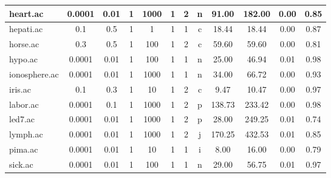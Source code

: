 \begin{table}[htbp]
{\begin{tabular}{|l|c|c|c|c|c|c|c||c|c|c|c|}
		\hline
		heart.ac       & 0.0001   & 0.01        & 1              & 1000                & 1             & 2      & n             & 91.00          & 182.00         & 0.00           & 0.85           \\
		\hline
		hepati.ac      & 0.1      & 0.5         & 1              & 1                   & 1             & 1      & c             & 18.44          & 18.44          & 0.00           & 0.87           \\
		\hline
		horse.ac       & 0.3      & 0.5         & 1              & 100                 & 1             & 2      & c             & 59.60          & 59.60          & 0.00           & 0.81           \\
		\hline
		hypo.ac        & 0.0001   & 0.01        & 1              & 100                 & 1             & 1      & n             & 25.00          & 46.94          & 0.01           & 0.98           \\
		\hline
		ionosphere.ac  & 0.0001   & 0.01        & 1              & 1000                & 1             & 1      & n             & 34.00          & 66.72          & 0.00           & 0.93           \\
		\hline
		iris.ac        & 0.1      & 0.3         & 1              & 10                  & 1             & 2      & c             & 9.47           & 10.47          & 0.00           & 0.97           \\
		\hline
		labor.ac       & 0.0001   & 0.1         & 1              & 1000                & 1             & 2      & p             & 138.73         & 233.42         & 0.00           & 0.98           \\
		\hline
		led7.ac        & 0.0001   & 0.01        & 1              & 1000                & 1             & 2      & p             & 28.00          & 249.25         & 0.01           & 0.74           \\
		\hline
		lymph.ac       & 0.0001   & 0.01        & 1              & 1000                & 1             & 2      & j             & 170.25         & 432.53         & 0.01           & 0.85           \\
		\hline
		pima.ac        & 0.0001   & 0.01        & 1              & 10                  & 1             & 1      & i             & 8.00           & 16.00          & 0.00           & 0.79           \\
		\hline
		sick.ac        & 0.0001   & 0.01        & 1              & 100                 & 1             & 1      & n             & 29.00          & 56.75          & 0.01           & 0.97           \\

\end{tabular}}
\end{table}
